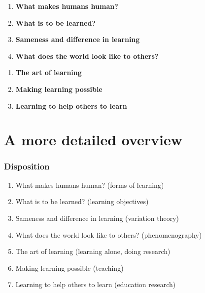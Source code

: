 \begin{frame}
  \begin{enumerate}
    \item \textbf<2>{What makes humans human?}
      \hfill
    \item \textbf<3>{What is to be learned?}
      \hfill
    \item \textbf<4>{Sameness and difference in learning}
      \hfill
    \item \textbf<5>{What does the world look like to others?}
      \hfill
      \setcounter{chnum}{\value{enumi}}
  \end{enumerate}
  \begin{enumerate}
    \setcounter{enumi}{\value{chnum}}
    \item \textbf<6>{The art of learning}
      \hfill
    \item \textbf<7>{Making learning possible}
      \hfill
    \item \textbf<8>{Learning to help others to learn}
      \hfill
  \end{enumerate}
\end{frame}


\part{A more detailed overview}

\begin{frame}
  \tableofcontents
\end{frame}

\section{Disposition}

\begin{frame}
  \begin{enumerate}
    \item What makes humans human?
      \hfill
      (forms of learning)
    \item What is to be learned?
      \hfill
      (learning objectives)
    \item Sameness and difference in learning
      \hfill
      (variation theory)
    \item What does the world look like to others?
      \hfill
      (phenomenography)
    \item The art of learning
      \hfill
      (learning alone, doing research)
    \item Making learning possible
      \hfill
      (teaching)
    \item Learning to help others to learn
      \hfill
      (education research)
  \end{enumerate}
\end{frame}


